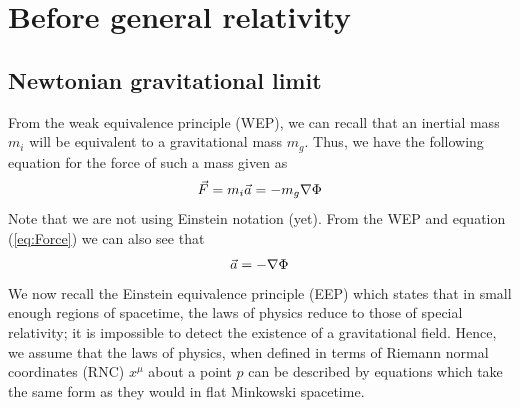 \documentclass{article}
\begin{document}
	\section{Before general relativity}
	\subsection{Newtonian gravitational limit}
	From the weak equivalence principle (WEP), we can recall that an inertial mass $m_i$ will be equivalent to a gravitational mass $m_g$. Thus, we have the following equation for the force of such a mass given as 
	\begin{equation}
		\label{eq:Force}
		\vec{F} = m_i\vec{a} = -m_g \nabla \Phi
	\end{equation}
	Note that we are not using Einstein notation (yet). From the WEP and equation (\ref{eq:Force}) we can also see that
	\begin{equation}
		\label{eq:Acceleration}
		\vec{a} = -\nabla\Phi
	\end{equation}
	We now recall the Einstein equivalence principle (EEP) which states that in small enough regions of spacetime, the laws of physics reduce to those of special relativity; it is impossible to detect the existence of a gravitational field. Hence, we assume that the laws of physics, when defined in terms of Riemann normal coordinates (RNC) $x^\mu$ about a point $p$ can be described by equations which take the same form as they would in flat Minkowski spacetime. 
	
\end{document}
